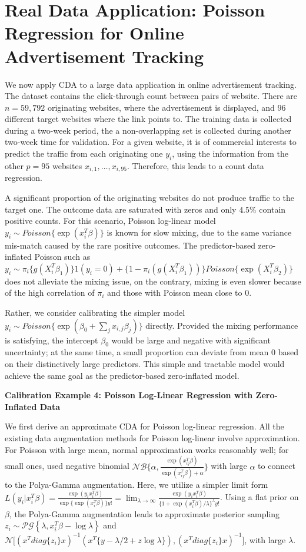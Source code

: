 \documentclass[10pt]{article}
\newcommand{\xbeta}{ x_i^T \beta}
\newcommand{\xbetaij}{ x_{ij}^T \beta}
\begin{document}
\section{Real Data Application: Poisson Regression for Online Advertisement Tracking}

We now apply CDA to a large data application in online advertisement tracking. The dataset contains the click-through count between pairs of website. There are $n=59,792$ originating websites, where the advertisement is displayed, and $96$ different target websites where the link points to. The training data is collected during a two-week period, the a non-overlapping set is collected during another two-week time for validation. For a given website, it is of commercial interests to predict the traffic from each originating one $y_i$, using the information from the other $p=95$ websites $x_{i,1},\ldots, x_{i,95}$. Therefore, this leads to a count data regression.

A significant proportion of the originating websites do not produce traffic to the target one. The outcome data are saturated with zeros and  only $4.5\%$ contain positive counts. For this scenario, Poisson log-linear model  $y_i\sim Poisson\{\exp(x_i^T\beta)\}$  is known for slow mixing, due to the same variance mis-match caused by the rare positive outcomes. The predictor-based zero-inflated Poisson such as $y_i\sim \pi_i\{ g(X_i^T\beta_1)\}  1(y_i=0)+ \{ 1-\pi_i(g(X_i^T\beta_1)) \} Poisson\{\exp (X_i^T \beta_2)\}$ does not alleviate the mixing issue, on the contrary,  mixing is even slower because of the high correlation of $\pi_i$ and those with Poisson mean close to $0$.

Rather, we consider calibrating the simpler model  $y_i\sim Poisson\{\exp(\beta_0+ \sum_j x_{i,j}\beta_j)\}$ directly. Provided the mixing performance is satisfying, the intercept $\beta_0$ would be large and negative with significant uncertainty; at the same time, a small proportion can deviate from mean $0$ based on their distinctively large predictors. This simple and tractable model would achieve the same goal as the predictor-based zero-inflated model.

{\bf Calibration Example 4: Poisson Log-Linear Regression with Zero-Inflated Data}

We first derive an approximate CDA for Poisson log-linear regression. All the existing data augmentation methods for Poisson log-linear involve approximation. For Poisson with large mean, normal approximation works reasonably well; for small ones, \cite{zhou2012lognormal}  used negative binomial $\mathcal{NB}\{ \alpha,\frac{\exp(\xbetaij)}{\exp(\xbetaij)+\alpha}\}$ with large $\alpha$ to connect to the Polya-Gamma augmentation. Here, we utilize a simpler limit form $L(y_i|\xbeta)=\frac{ \exp(y_i \xbeta)}{\exp\{\exp(\xbeta)\}y!} =\lim_{\lambda\rightarrow\infty}\frac{\exp(y_i \xbeta)}{\{1+ \exp(\xbeta)/\lambda\}^{\lambda}y!}$. Using a flat prior on $\beta$, the Polya-Gamma augmentation leads to approximate posterior sampling $z_i \sim \mathcal{PG}\left\{\lambda, \xbeta -\log \lambda\right\}$ and $\mathcal{N}\big[ (x^T diag\{z_i\} x )^{-1} (x^T  \big \{ y - \lambda/2 + z \log \lambda \big\} ),(x^T diag\{z_i\} x )^{-1} \big]$, with large $\lambda$.
\end{document}
